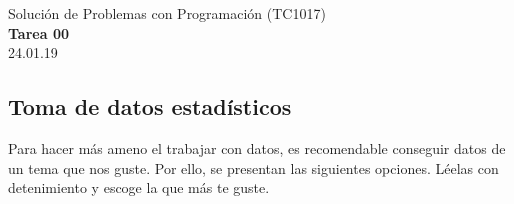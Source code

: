 \documentclass[]{book}
\theoremstyle{definition}
\begin{document}
\begin{center}
{\huge Solución de Problemas con Programación (TC1017)}\\[1.5ex]
{\large \textbf{Tarea 00}\\[1.5ex] %
24.01.19} %
\end{center}

\vspace{0.2 cm}

\subsection*{Toma de datos estadísticos}

Para hacer más ameno el trabajar con datos, es recomendable conseguir datos de un tema que nos guste.
Por ello, se presentan las siguientes opciones. Léelas con detenimiento y escoge la que más te guste.
\end{document}
